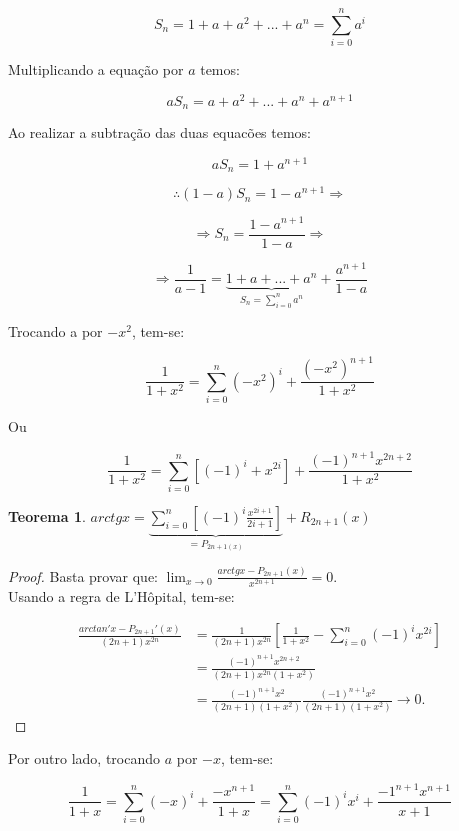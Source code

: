 \documentclass{article}
\newtheorem*{theorem}{Teorema}
\begin{document}
\pagebreak

\[
    S_n = 1 + a + a^2 + ... + a^n = \sum_{i=0}^{n} a^i
\]    

Multiplicando a equação por $a$ temos:

\[
    aS_n = a + a^2 + ... + a^n + a^{n+1}
\]

Ao realizar a subtração das duas equacões temos:

\[
    aS_n = 1 + a^{n+1}
\]

\[
    \therefore (1-a)S_n = 1-a^{n+1} \Rightarrow
\]

\[
    \Rightarrow  S_n = \frac{1-a^{n+1}}{1-a} \Rightarrow
\]

\[
    \Rightarrow \frac{1}{a-1} = \underbrace{1 + a + ... + a^n}_{S_n = \sum_{i=0}^{n} a^n} + \frac{a^{n+1}}{1-a}
\]

Trocando a por $-x^2$, tem-se:

\[
\frac{1}{1+x^2} = \sum_{i=0}^{n} (-x^{2})^i + \frac{(-x^2)^{n+1}}{1+x^2}
\]    

Ou

\[
  \frac{1}{1+x^2}  = \sum_{i=0}^{n} [(-1)^i+x^{2i}] + \frac{(-1)^{n+1}x^{2n+2}}{1+x^2}
\]

\begin{theorem}
    $arctg x = \underbrace{\sum_{i=0}^n[(-1)^i \frac{x^{2i+1}}{2i+1}]}_{=P_{2n+1(x)}}  + R_{2n+1}(x)$
\end{theorem}

\begin{proof}
    Basta provar que: $\lim_{x \rightarrow 0} \frac{arctgx - P_{2n+1}(x)}{x^{2n+1}} = 0$. \\
    Usando a regra de L'Hôpital, tem-se:

    \begin{align*}
    \frac{arctan'x - P_{2n+1}'(x)}{(2n+1)x^{2n}} &= \frac{1}{(2n+1)x^{2n}}\left[\frac{1}{1+x^2} - \sum_{i=0}^n{(-1)^i x^{2i}}\right] \\
    &= \frac{(-1)^{n+1} x^{2n+2}}{(2n+1) x^{2n} (1+x^2)} \\
    &= \frac{(-1)^{n+1} x^2}{(2n+1)(1+x^2)}\frac{(-1)^{n+1} x^2}{(2n+1)(1+x^2)} \rightarrow 0. 
    \end{align*}
\end{proof}

Por outro lado, trocando $a$ por $-x$, tem-se:

$$
\frac{1}{1+x} = \sum^n_{i=0}(-x)^i + \frac{-x^{n+1}}{1+x} = \sum^n_{i=0}(-1)^ix^i+\frac{-1^{n+1}x^{n+1}}{x+1}
$$
\end{document}
